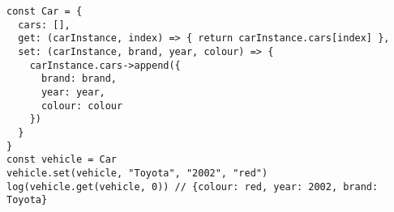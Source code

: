 \vspace{-2.25em}
\begin{center}
\begin{minipage}[t]{1\textwidth}
\begin{listing}[H]
\begin{spacing}{0.6}
\begin{verbatim}
const Car = {
  cars: [],
  get: (carInstance, index) => { return carInstance.cars[index] },
  set: (carInstance, brand, year, colour) => {
    carInstance.cars->append({
      brand: brand,
      year: year,
      colour: colour
    })
  }
}
const vehicle = Car
vehicle.set(vehicle, "Toyota", "2002", "red")
log(vehicle.get(vehicle, 0)) // {colour: red, year: 2002, brand: Toyota}
\end{verbatim}
\end{spacing}
\end{listing}
\end{minipage}
\end{center}
